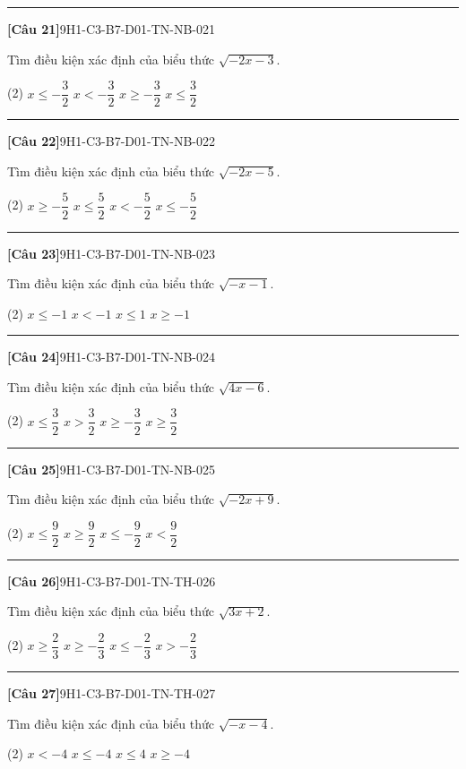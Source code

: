 \documentclass[12pt,a4paper]{article}
\newif\ifloigiai
\newenvironment{cauhoi}[2]{%
  \par\medskip\noindent\rule{\textwidth}{0.4pt}\par\nopagebreak
  \noindent\textbf{[#1]}\hfill{\scriptsize\ttfamily #2}\par\nopagebreak\smallskip}{\par}
\newcommand{\dapan}[1]{\ifloigiai\par\smallskip\noindent\textit{Đáp án:} \textbf{#1}\par\fi}
\begin{document}
\begin{cauhoi}{Câu 21}{9H1-C3-B7-D01-TN-NB-021}
Tìm điều kiện xác định của biểu thức $\sqrt{-2x - 3}$.
\begin{tasks}(2)
\task $x\le -\dfrac{3}{2}$
\task $x<-\dfrac{3}{2}$
\task $x\ge -\dfrac{3}{2}$
\task $x\le \dfrac{3}{2}$
\end{tasks}
\dapan{A}
\end{cauhoi}
\begin{cauhoi}{Câu 22}{9H1-C3-B7-D01-TN-NB-022}
Tìm điều kiện xác định của biểu thức $\sqrt{-2x - 5}$.
\begin{tasks}(2)
\task $x\ge -\dfrac{5}{2}$
\task $x\le \dfrac{5}{2}$
\task $x<-\dfrac{5}{2}$
\task $x\le -\dfrac{5}{2}$
\end{tasks}
\dapan{D}
\end{cauhoi}
\begin{cauhoi}{Câu 23}{9H1-C3-B7-D01-TN-NB-023}
Tìm điều kiện xác định của biểu thức $\sqrt{-x - 1}$.
\begin{tasks}(2)
\task $x\le -1$
\task $x<-1$
\task $x\le 1$
\task $x\ge -1$
\end{tasks}
\dapan{A}
\end{cauhoi}
\begin{cauhoi}{Câu 24}{9H1-C3-B7-D01-TN-NB-024}
Tìm điều kiện xác định của biểu thức $\sqrt{4x - 6}$.
\begin{tasks}(2)
\task $x\le \dfrac{3}{2}$
\task $x>\dfrac{3}{2}$
\task $x\ge -\dfrac{3}{2}$
\task $x\ge \dfrac{3}{2}$
\end{tasks}
\dapan{D}
\end{cauhoi}
\begin{cauhoi}{Câu 25}{9H1-C3-B7-D01-TN-NB-025}
Tìm điều kiện xác định của biểu thức $\sqrt{-2x + 9}$.
\begin{tasks}(2)
\task $x\le \dfrac{9}{2}$
\task $x\ge \dfrac{9}{2}$
\task $x\le -\dfrac{9}{2}$
\task $x<\dfrac{9}{2}$
\end{tasks}
\dapan{A}
\end{cauhoi}
\begin{cauhoi}{Câu 26}{9H1-C3-B7-D01-TN-TH-026}
Tìm điều kiện xác định của biểu thức $\sqrt{3x + 2}$.
\begin{tasks}(2)
\task $x\ge \dfrac{2}{3}$
\task $x\ge -\dfrac{2}{3}$
\task $x\le -\dfrac{2}{3}$
\task $x>-\dfrac{2}{3}$
\end{tasks}
\dapan{B}
\end{cauhoi}
\begin{cauhoi}{Câu 27}{9H1-C3-B7-D01-TN-TH-027}
Tìm điều kiện xác định của biểu thức $\sqrt{-x - 4}$.
\begin{tasks}(2)
\task $x<-4$
\task $x\le -4$
\task $x\le 4$
\task $x\ge -4$
\end{tasks}
\dapan{B}
\end{cauhoi}
\end{document}
